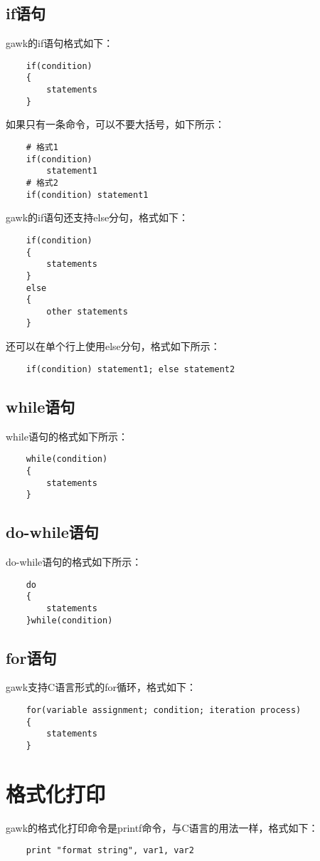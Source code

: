 \documentclass[a4paper,left=2.5cm,right=2.5cm,11pt]{article}
\begin{document}
\subsection{if语句}
	gawk的if语句格式如下：
	\begin{lstlisting}
	if(condition)
	{
		statements
	}
	\end{lstlisting}

	如果只有一条命令，可以不要大括号，如下所示：
	\begin{lstlisting}
	# 格式1
	if(condition)
		statement1
	# 格式2
	if(condition) statement1
	\end{lstlisting}

	gawk的if语句还支持else分句，格式如下：
	\begin{lstlisting}
	if(condition)
	{
		statements
	}
	else
	{
		other statements
	}
	\end{lstlisting}

	还可以在单个行上使用else分句，格式如下所示：
	\begin{lstlisting}
	if(condition) statement1; else statement2
	\end{lstlisting}

\subsection{while语句}
	while语句的格式如下所示：
	\begin{lstlisting}
	while(condition)
	{
		statements
	}
	\end{lstlisting}

\subsection{do-while语句}
	do-while语句的格式如下所示：
	\begin{lstlisting}
	do
	{
		statements
	}while(condition)
	\end{lstlisting}

\subsection{for语句}
	gawk支持C语言形式的for循环，格式如下：
	\begin{lstlisting}
	for(variable assignment; condition; iteration process)
	{
		statements
	}
	\end{lstlisting}

\section{格式化打印}
	gawk的格式化打印命令是printf命令，与C语言的用法一样，格式如下：
	\begin{lstlisting}
	print "format string", var1, var2
	\end{lstlisting}
\end{document}
